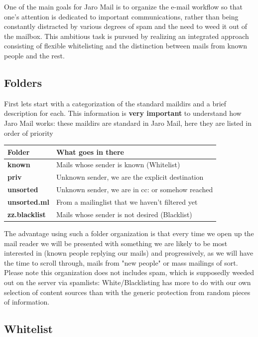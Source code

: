 \documentclass[a4,onecolumn,portrait]{article}
\begin{document}
One of the main goals for Jaro Mail is to organize the e-mail workflow
so that one's attention is dedicated to important communications,
rather than being constantly distracted by various degrees of spam and
the need to weed it out of the mailbox. This ambitious task is pursued
by realizing an integrated approach consisting of flexible
whitelisting and the distinction between mails from known people and
the rest.

\subsection{Folders}
\label{sec-5-1}

First lets start with a categorization of the standard maildirs and a
brief description for each. This information is \textbf{very important} to
understand how Jaro Mail works: these maildirs are standard in Jaro
Mail, here they are listed in order of priority

\begin{center}
\begin{tabular}{ll}
Folder & What goes in there\\
\hline
\textbf{known} & Mails whose sender is known (Whitelist)\\
\textbf{priv} & Unknown sender, we are the explicit destination\\
\textbf{unsorted} & Unknown sender, we are in cc: or somehow reached\\
\textbf{unsorted.ml} & From a mailinglist that we haven't filtered yet\\
\textbf{zz.blacklist} & Mails whose sender is not desired (Blacklist)\\
\end{tabular}
\end{center}

The advantage using such a folder organization is that every time we
open up the mail reader we will be presented with something we are
likely to be most interested in (known people replying our mails) and
progressively, as we will have the time to scroll through, mails from
"new people" or mass mailings of sort. Please note this organization
does not includes spam, which is supposedly weeded out on the server
via spamlists: White/Blacklisting has more to do with our own
selection of content sources than with the generic protection from
random pieces of information.
\subsection{Whitelist}
\label{sec-5-2}
\end{document}
